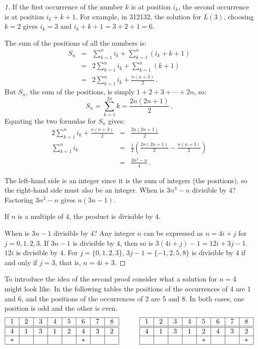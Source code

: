 \begin{proof}[1] If the first occurrence of the number $k$ is at position $i_k$, the second occurrence is at position $i_k+k+1$. For example, in 3{}1{}2{}1{}3{}2, the solution for $L(3)$,  choosing $k=2$ gives $i_k=3$ and $i_k+k+1=3+2+1=6$.

The sum of the positions of all the numbers is:
\begin{eqnarray*}
S_n&=&\sum_{k=1}^{n}i_k+\sum_{k=1}^{n}(i_k+k+1)\\
& =& 2\sum_{k=1}^{n}i_k+\sum_{k=1}^{n}(k+1)\\
&=& 2\sum_{k=1}^{n}i_k+\frac{n(n+3)}{2}\,.
\end{eqnarray*}
But $S_n$, the sum of the positions, is simply $1+2+3+\cdots+2n$, so:
\[
S_n=\sum_{k=1}^{2n}k = \frac{2n(2n+1)}{2}\,.
\]
Equating the two formulas for $S_n$ gives:
\begin{eqnarray*}
2\sum_{k=1}^{n}i_k+\frac{n(n+3)}{2} &=& \frac{2n(2n+1)}{2}\\
\sum_{k=1}^{n}i_k &=& \frac{1}{2}\left(\frac{2n(2n+1)}{2} - \frac{n(n+3)}{2}\right) \\
&=& \frac{3n^2-n}{4}\,.
\end{eqnarray*}

The left-hand side is an integer since it is the sum of integers (the positions), so the right-hand side must also be an integer. When is $3n^3-n$ divisible by $4$? Factoring $3n^2-n$ gives $n(3n-1)$.

If $n$ is a multiple of $4$, the product is divisible by $4$.

When is $3n-1$ divisible by $4$? Any integer $n$ can be expressed as $n=4i+j$ for $j=0,1,2,3$. If $3n-1$ is divisible by $4$, then so is $3(4i+j)-1 = 12i+3j-1$. $12i$ is divisible by $4$. For $j=\{0,1,2,3\}$, $3j-1=\{-1,2,5,8\}$ is divisible by $4$ if and only if $j=3$, that is, $n=4i+3$.
\end{proof}

\newpage

To introduce the idea of the second proof consider what a solution for $n=4$ might look like. In the following tables the positions of the occurrences of 4 are 1 and 6, and the positions of the occurrences of 2 are 5 and 8. In both cases, one position is odd and the other is even. 
\[
\addtolength{\arraycolsep}{1mm}
\begin{array}{|c|c|c|c|c|c|c|c|}
\hline
1&2&3&4&5&6&7&8\\
\hline\hline
4&1&3&1&2&4&3&2\\\hline
*&&&&&*&&\\\hline
\end{array}
\hspace{3em}
\begin{array}{|c|c|c|c|c|c|c|c|}
\hline
1&2&3&4&5&6&7&8\\
\hline\hline
4&1&3&1&2&4&3&2\\\hline
&&&&*&&&*\\\hline
\end{array}
\]


